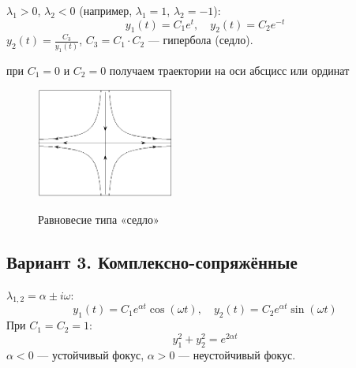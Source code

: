 	$\lambda_1 > 0$, $\lambda_2 < 0$ (например, $\lambda_1 = 1$, $\lambda_2 = -1$):
	\newline
	\begin{equation}
		y_1(t) = C_1 e^{t}, \quad y_2(t) = C_2 e^{-t}
	\end{equation}
	$y_2(t) = \frac{C_3}{y_1(t)}$, $C_3 = C_1 \cdot C_2$ — гипербола (седло).
	\par
	\vspace{0.5em}
	при $C_1 = 0$ и $C_2 = 0$ получаем траектории на оси абсцисс или ординат
	
	\begin{figure}[H]
		\centering
		\includegraphics[width=0.4\textwidth, height=0.2\textheight]{img/3_04}
		\par
		\small Равновесие типа «седло»
	\end{figure}
	
	\begin{pinkbox}
		\subsection*{Вариант 3. Комплексно-сопряжённые}
	\end{pinkbox}
	
	$\lambda_{1,2} = \alpha \pm i \omega$:
	\begin{equation}
		y_1(t) = C_1 e^{\alpha t} \cos(\omega t), \quad y_2(t) = C_2 e^{\alpha t} \sin(\omega t)
	\end{equation}
	При $C_1 = C_2 = 1$:
	\begin{equation}
		y_1^2 + y_2^2 = e^{2 \alpha t}
	\end{equation}
	$\alpha < 0$ — устойчивый фокус, $\alpha > 0$ — неустойчивый фокус.
	
